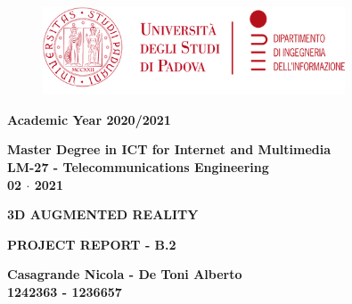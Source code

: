 
\begin{titlepage}
   \begin{center}
   \begin{doublespacing}

       \begin{figure}
       \centering
       \includegraphics[width=0.8\textwidth]{images/logo.png}
       \end{figure}
       
       \vspace*{10mm}
       {\large\textbf{Academic Year 2020/2021}}
       
       
       \vspace{10mm}
       {\large\textbf{Master Degree in ICT for Internet and Multimedia}\\
       \large\textbf{LM-27 - Telecommunications Engineering}\\
       \vspace{10mm}
       \textbf{02 $\cdot$ 2021}}

       
       
       \vspace*{5mm}
       {\Large\textbf{3D AUGMENTED REALITY}}

       \vspace{30mm}
       
       {\Large\textbf{PROJECT REPORT - B.2}}

    
            
       \vspace{30mm}

       {\large\textbf{Casagrande Nicola - De Toni Alberto}\\
       \textbf{1242363 - 1236657}}

       \vfill
              
    \end{doublespacing}

   \end{center}
\end{titlepage}

